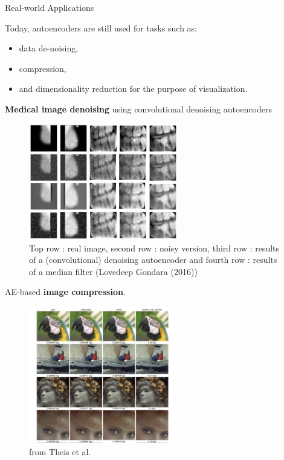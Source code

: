 \begin{vbframe}{Real-world Applications}

Today, autoencoders are still used for tasks such as: 
\begin{itemize}
\item  data de-noising,
\item  compression,
\item and dimensionality reduction for the purpose of visualization.
\end{itemize}

\framebreak 
  \textbf{Medical image denoising} using convolutional denoising autoencoders
  \begin{figure}
    \centering
    \includegraphics[width=6.5cm]{plots/denoising_autoencoder_application.png}
    \caption{Top row : real image, second row   : noisy version, third row : results of a (convolutional) denoising autoencoder and fourth row : results of a median filter (Lovedeep Gondara (2016))}
  \end{figure}
  
  \framebreak
  AE-based \textbf{image compression}.
  \begin{figure}
    \centering
    \includegraphics[width=6.5cm]{plots/image-compression.png}
    \caption{from Theis et al. }
    \end{figure}
  
  
\end{vbframe}


\endlecture
